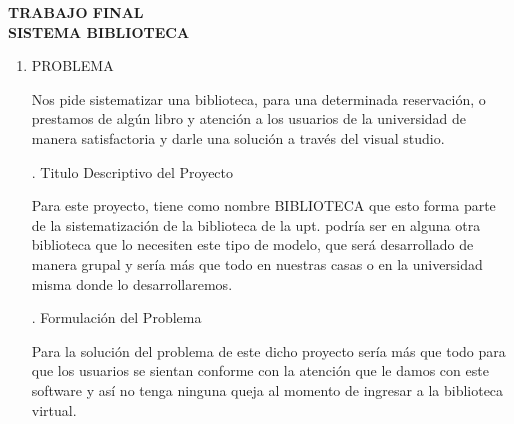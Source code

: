 \documentclass[12pt]{article}
\begin{document}
\begin{center}
\begin{Large}
\textbf{TRABAJO FINAL\\
\vspace*{0.42in}
SISTEMA BIBLIOTECA} 
\end{Large}
\end{center}
\vspace{\baselineskip}
\begin{enumerate}[label*=\arabic*.]

\vspace{\baselineskip}

    \item PROBLEMA \par
    
\vspace{\baselineskip}
	

\vspace{\baselineskip}
{\fontsize{13pt}{15.6pt}\selectfont Nos pide sistematizar una biblioteca, para una determinada reservación, o prestamos de algún libro y atención a los usuarios de la universidad de manera satisfactoria y darle una solución a través del visual studio.\  \par}\par

{\fontsize{13pt}{15.6pt}. Titulo Descriptivo del Proyecto\par}\par

\begin{adjustwidth}{0.35in}{0.0in}{\fontsize{13pt}{15.6pt}\selectfont Para este proyecto, tiene como nombre BIBLIOTECA que esto forma parte de la sistematización de la biblioteca de la upt. podría ser en alguna otra biblioteca que lo necesiten este tipo de modelo, que será desarrollado de manera grupal y sería más que todo en nuestras casas o en la universidad misma donde lo desarrollaremos.\par}\par

\end{adjustwidth}

{\fontsize{13pt}{15.6pt}. Formulación del Problema\par}\par

\begin{adjustwidth}{0.35in}{0.0in}

{\fontsize{13pt}{15.6pt}\selectfont Para la solución del problema de este dicho proyecto sería más que todo para que los usuarios se sientan conforme con la atención que le damos con este software y así no tenga ninguna queja al momento de ingresar a la biblioteca virtual.\par}\par


\end{adjustwidth}
\end{enumerate}
\end{document}
